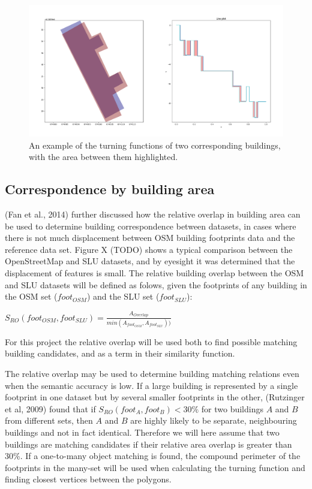 \documentclass[a4paper]{article}
\begin{document}
\begin{figure}[H]
    \centering
    \includegraphics[width=\textwidth,height=0.5\textheight,keepaspectratio]{img_turn_function_diff_filled}
    \caption{An example of the turning functions of two corresponding buildings, with the area between them highlighted.}
    \label{fig:space}
\end{figure}

\subsection{Correspondence by building area}

(Fan et al., 2014) further discussed how the relative overlap in building area can be used to determine building correspondence between datasets, in cases where there is not much displacement between OSM building footprints data and the reference data set. Figure X (TODO) shows a typical comparison between the OpenStreetMap and SLU datasets, and by eyesight it was determined that the displacement of features is small. The relative building overlap between the OSM and SLU datasets will be defined as folows, given the footprints of any building in the OSM set ($foot_{OSM}$) and the SLU set ($foot_{SLU}$):

\begin{center}
    $S_{RO}(foot_{OSM}, foot_{SLU}) = \frac{A_{Overlap}}{min(A_{foot_{OSM}}, A_{foot_{SLU}}))}$
\end{center}

For this project the relative overlap will be used both to find possible matching building candidates, and as a term in their similarity function.

The relative overlap may be used to determine building matching relations even when the semantic accuracy is low. If a large building is represented by a single footprint in one dataset but by several smaller footprints in the other, (Rutzinger et al, 2009) found that if $S_{RO}(foot_{A}, foot_{B}) < 30\%$ for two buildings $A$ and $B$ from different sets, then $A$ and $B$ are highly likely to be separate, neighbouring buildings and not in fact identical. Therefore we will here assume that two buildings are matching candidates if their relative area overlap is greater than 30\%. If a one-to-many object matching is found, the compound perimeter of the footprints in the many-set will be used when calculating the turning function and finding closest vertices between the polygons.
\end{document}

